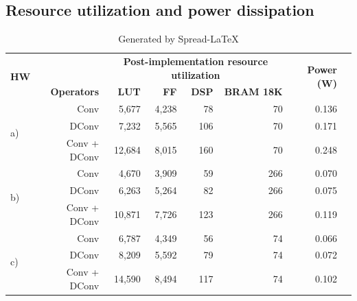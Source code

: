 \subsection{Resource utilization and power dissipation}
\begin{table}[!htp]\centering
	\caption{Generated by Spread-LaTeX}\label{tab: }
	\scriptsize
	\begin{tabular}{lrrrrrrr}\toprule
		\multirow{2}{*}{\textbf{HW}} &\textbf{} &\multicolumn{4}{c}{\textbf{Post-implementation resource utilization}} &\multirow{2}{*}{\textbf{Power (W)}} \\\cmidrule{3-6}
		&\textbf{Operators} &\textbf{LUT} &\textbf{FF} &\textbf{DSP} &\textbf{BRAM 18K} & \\\midrule
		\multirow{3}{*}{a)} &Conv &5,677 &4,238 &78 &70 &0.136 \\
		&DConv &7,232 &5,565 &106 &70 &0.171 \\
		&Conv + DConv &12,684 &8,015 &160 &70 &0.248 \\
		\multirow{3}{*}{b)} &Conv &4,670 &3,909 &59 &266 &0.070 \\
		&DConv &6,263 &5,264 &82 &266 &0.075 \\
		&Conv + DConv &10,871 &7,726 &123 &266 &0.119 \\
		\multirow{3}{*}{c)} &Conv &6,787 &4,349 &56 &74 &0.066 \\
		&DConv &8,209 &5,592 &79 &74 &0.072 \\
		&Conv + DConv &14,590 &8,494 &117 &74 &0.102 \\
		\bottomrule
	\end{tabular}
\end{table}


